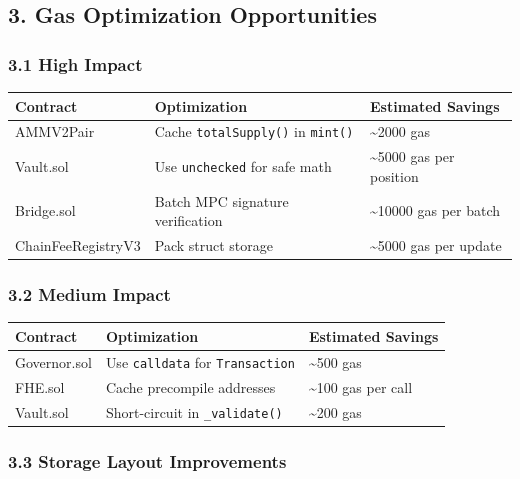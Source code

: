 \documentclass[
]{article}
\newcounter{none} %
\begin{document}
\subsection{3. Gas Optimization
Opportunities}\label{3-gas-optimization-opportunities}

\subsubsection{3.1 High Impact}\label{31-high-impact}

{\def\LTcaptype{none} %
\begin{longtable}[]{@{}lll@{}}
\toprule\noalign{}
Contract & Optimization & Estimated Savings \\
\midrule\noalign{}
\endhead
\bottomrule\noalign{}
\endlastfoot
AMMV2Pair & Cache \texttt{totalSupply()} in \texttt{mint()} &
\textasciitilde2000 gas \\
Vault.sol & Use \texttt{unchecked} for safe math & \textasciitilde5000
gas per position \\
Bridge.sol & Batch MPC signature verification & \textasciitilde10000 gas
per batch \\
ChainFeeRegistryV3 & Pack struct storage & \textasciitilde5000 gas per
update \\
\end{longtable}
}

\subsubsection{3.2 Medium Impact}\label{32-medium-impact}

{\def\LTcaptype{none} %
\begin{longtable}[]{@{}lll@{}}
\toprule\noalign{}
Contract & Optimization & Estimated Savings \\
\midrule\noalign{}
\endhead
\bottomrule\noalign{}
\endlastfoot
Governor.sol & Use \texttt{calldata} for \texttt{Transaction} &
\textasciitilde500 gas \\
FHE.sol & Cache precompile addresses & \textasciitilde100 gas per
call \\
Vault.sol & Short-circuit in \texttt{\_validate()} & \textasciitilde200
gas \\
\end{longtable}
}

\subsubsection{3.3 Storage Layout
Improvements}\label{33-storage-layout-improvements}
\end{document}
